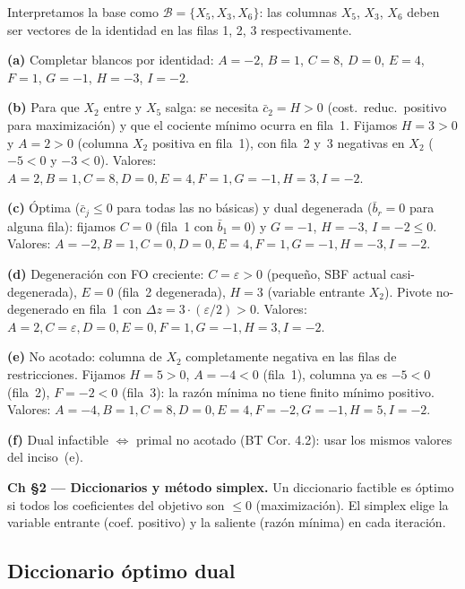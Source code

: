 \documentclass[12pt]{article}
\theoremstyle{plain}
\begin{document}
\begin{solucion}

Interpretamos la base como $\mathcal{B}=\{X_5,X_3,X_6\}$: las columnas $X_5$, $X_3$, $X_6$ deben ser vectores de la identidad en las filas 1, 2, 3 respectivamente.

\noindent\textbf{(a)} Completar blancos por identidad: $A=-2$, $B=1$, $C=8$, $D=0$, $E=4$, $F=1$, $G=-1$, $H=-3$, $I=-2$.

\noindent\textbf{(b)} Para que $X_2$ entre y $X_5$ salga: se necesita $\bar{c}_2=H>0$ (cost.~reduc.~positivo para maximización) y que el cociente mínimo ocurra en fila~1. Fijamos $H=3>0$ y $A=2>0$ (columna $X_2$ positiva en fila~1), con fila~2 y~3 negativas en $X_2$ ($-5<0$ y $-3<0$). Valores: $A=2, B=1, C=8, D=0, E=4, F=1, G=-1, H=3, I=-2$.

\noindent\textbf{(c)} Óptima ($\bar{c}_j\leq 0$ para todas las no básicas) y dual degenerada ($\bar{b}_r=0$ para alguna fila): fijamos $C=0$ (fila~1 con $\bar{b}_1=0$) y $G=-1$, $H=-3$, $I=-2\leq 0$. Valores: $A=-2, B=1, C=0, D=0, E=4, F=1, G=-1, H=-3, I=-2$.

\noindent\textbf{(d)} Degeneración con FO creciente: $C=\varepsilon>0$ (pequeño, SBF actual casi-degenerada), $E=0$ (fila~2 degenerada), $H=3$ (variable entrante $X_2$). Pivote no-degenerado en fila~1 con $\Delta z=3\cdot(\varepsilon/2)>0$. Valores: $A=2, C=\varepsilon, D=0, E=0, F=1, G=-1, H=3, I=-2$.

\noindent\textbf{(e)} No acotado: columna de $X_2$ completamente negativa en las filas de restricciones. Fijamos $H=5>0$, $A=-4<0$ (fila~1), columna ya es $-5<0$ (fila~2), $F=-2<0$ (fila~3): la razón mínima no tiene finito mínimo positivo. Valores: $A=-4, B=1, C=8, D=0, E=4, F=-2, G=-1, H=5, I=-2$.

\noindent\textbf{(f)} Dual infactible $\Leftrightarrow$ primal no acotado (BT Cor. 4.2): usar los mismos valores del inciso~(e).

\end{solucion}

\begin{teofund}
\textbf{Ch §2 — Diccionarios y método simplex.} Un diccionario factible es óptimo si todos los coeficientes del objetivo son $\leq 0$ (maximización). El simplex elige la variable entrante (coef. positivo) y la saliente (razón mínima) en cada iteración.
\end{teofund}

\bigskip

\subsection{Diccionario óptimo dual}
\end{document}
